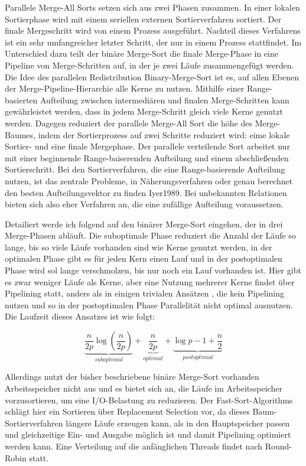 \documentclass[a4paper,12pt,twoside]{article}
\begin{document}
Parallele Merge-All Sorts {\autocite[S. 831f]{Taniar2000}} setzen sich aus zwei Phasen zusammen. In einer lokalen Sortierphase wird mit einem seriellen externen Sortierverfahren sortiert. Der finale Mergeschritt wird von einem Prozess ausgeführt. Nachteil dieses Verfahrens ist ein sehr umfangreicher letzter Schritt, der nur in einem Prozess stattfindet. Im Unterschied dazu teilt der binäre Merge-Sort {\autocite[S. 832f]{Taniar2000}} die finale Merge-Phase in eine Pipeline von Merge-Schritten auf, in der je zwei Läufe zusammengefügt werden. Die Idee des parallelen Redistribution Binary-Merge-Sort {\autocite[S. 833]{Taniar2000}} ist es, auf allen Ebenen der Merge-Pipeline-Hierarchie alle Kerne zu nutzen. Mithilfe einer Range-basierten Aufteilung zwischen intermediären und finalen Merge-Schritten kann gewährleistet werden, dass in jedem Merge-Schritt gleich viele Kerne genutzt werden. Dagegen reduziert der parallele Merge-All Sort {\autocite[S. 833f]{Taniar2000}} die höhe des Merge-Baumes, indem der Sortierprozess auf zwei Schritte reduziert wird: eime lokale Sortier- und eine finale Mergephase. Der parallele verteilende Sort arbeitet nur mit einer beginnende Range-baiserenden Aufteilung und einem abschließenden Sortierschritt. Bei den Sortierverfahren, die eine Range-basierende Aufteilung nutzen, ist das zentrale Probleme, in Näherungsverfahren oder genau berechnet den besten Aufteilungsvektor zu finden {\autocite{Lu1994}{Iyer1989}}. Bei unbekannten Relationen bieten sich also eher Verfahren an, die eine zufällige Aufteilung voraussetzen.

Detailiert werde ich {\textcite[S. 333ff]{Bitton1983}} folgend auf den binärer Merge-Sort eingehen, der in drei Merge-Phasen abläuft. Die suboptimale Phase reduziert die Anzahl der Läufe so lange, bis so viele Läufe vorhanden sind wie Kerne genutzt werden, in der optimalen Phase gibt es für jeden Kern einen Lauf und in der postoptimalen Phase wird sol lange verschmolzen, bis nur noch ein Lauf vorhanden ist. Hier gibt es zwar weniger Läufe als Kerne, aber eine Nutzung mehrerer Kerne findet über Pipelining statt, anders als in einigen trivialen Ansätzen {\autocite{Yu1998}}, die kein Pipelining nutzen und so in der postoptimalen Phase Parallelität nicht optimal ausnutzen. Die Laufzeit dieses Ansatzes ist wie folgt:

\[ \underbrace{\frac{n}{2p} \log \left( \frac{n}{2p} \right)}_{suboptimal} + \underbrace{\frac{n}{2p}}_{optimal} + \underbrace{\log p - 1 + \frac{n}{2}}_{postoptimal} \]

Allerdings nutzt der bisher beschriebene binäre Merge-Sort vorhanden Arbeitsspeicher nicht aus und es bietet sich an, die Läufe im Arbeitsspeicher vorzusortieren, um eine I/O-Belastung zu reduzieren. Der Fast-Sort-Algorithms {\autocite{Tsukerman1986, Salzberg1990}} schlägt hier ein Sortieren über Replacement Selection {\autocite[vgl. ]{Knuth1973}} vor, da dieses Baum-Sortierverfahren längere Läufe erzeugen kann, als in den Hauptspeicher passen und gleichzeitige Ein- und Ausgabe möglich ist und damit Pipelining optimiert werden kann. Eine Verteilung auf die anfänglichen Threads findet nach Round-Robin statt.
\end{document}
